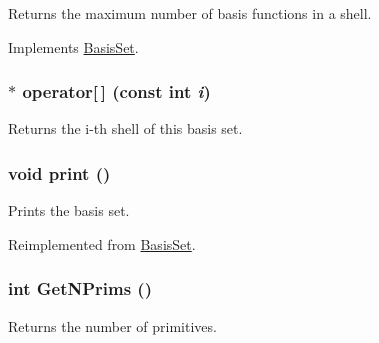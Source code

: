 Returns the maximum number of basis functions in a shell. 

Implements \hyperlink{classJKBuilder_1_1BasisSet_a7c12871050e478f6a22c4c1c46bd4b21}{BasisSet}.\hypertarget{classJKBuilder_1_1AtomicBasisSet_a6da2f2341be7b61c7221afb16fdd72db}{
\subsubsection[{operator[]}]{ $\ast$ operator\mbox{[}$\,$\mbox{]} (const int {\em i})}}
\label{classJKBuilder_1_1AtomicBasisSet_a6da2f2341be7b61c7221afb16fdd72db}


Returns the i-\/th shell of this basis set. \hypertarget{classJKBuilder_1_1AtomicBasisSet_a388f572c62279f839ee138a9afbdeeb5}{
\subsubsection[{print}]{\setlength{\rightskip}{0pt plus 5cm}void print ()}}
\label{classJKBuilder_1_1AtomicBasisSet_a388f572c62279f839ee138a9afbdeeb5}


Prints the basis set. 

Reimplemented from \hyperlink{classJKBuilder_1_1BasisSet_a388f572c62279f839ee138a9afbdeeb5}{BasisSet}.\hypertarget{classJKBuilder_1_1BasisSet_abc886cd4e35d3c56a0250b7d06986f61}{
\subsubsection[{GetNPrims}]{\setlength{\rightskip}{0pt plus 5cm}int GetNPrims ()}}
\label{classJKBuilder_1_1BasisSet_abc886cd4e35d3c56a0250b7d06986f61}


Returns the number of primitives. 

